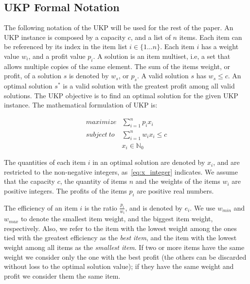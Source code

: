 \documentclass[runningheads,a4paper]{llncs}
\begin{document}

\subsection{UKP Formal Notation}

The following notation of the UKP will be used for the rest of the paper. An UKP instance is composed by a capacity \(c\), and a list of \(n\) items.
Each item can be referenced by its index in the item list \(i \in \{1\dots n\}\). 
Each item \(i\) has a weight value \(w_i\), and a profit value \(p_i\).
A solution is an item multiset, i.e, a set that allows multiple copies of the same element.
The sum of the items weight, or profit, of a solution \(s\) is denoted by \(w_s\), or \(p_s\).
A valid solution \(s\) has \(w_s \leq c\).
An optimal solution \(s^*\) is a valid solution with the greatest profit among all valid solutions.
The UKP objective is to find an optimal solution for the given UKP instance. 
The mathematical formulation of UKP is:

\begin{align}
  maximize &\sum_{i=1}^n p_i x_i\label{eq:objfun}\\
subject~to &\sum_{i=1}^n w_i x_i \leq c\label{eq:capcons}\\
            &x_i \in \mathbb{N}_0\label{eq:x_integer}
\end{align}

The quantities of each item \(i\) in an optimal solution are denoted by \(x_i\), and are restricted to the non-negative integers, as~\eqref{eq:x_integer} indicates. 
We assume that the capacity \(c\), the quantity of items \(n\) and the weights of the items \(w_i\) are positive integers. 
The profits of the items \(p_i\) are positive real numbers.

The efficiency of an item \(i\) is the ratio \(\frac{p_i}{w_i}\), and is denoted by \(e_i\). 
We use \(w_{min}\) and \(w_{max}\) to denote the smallest item weight, and the biggest item weight, respectively. 
Also, we refer to the item with the lowest weight among the ones tied with the greatest efficiency as the \emph{best item}, 
and the item with the lowest weight among all items as the \emph{smallest item}.
If two or more items have the same weight we consider only the one with the best profit (the others can be discarded without loss to the optimal solution value); if they have the same weight and profit we consider them the same item.
\end{document}
